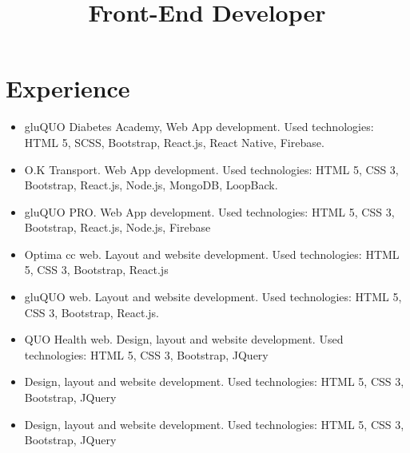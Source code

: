 \documentclass[11pt,a4paper]{moderncv}
\title{Front-End Developer}
\begin{document}
\maketitle
\section{Experience}
{\begin{itemize}
\item gluQUO Diabetes Academy, Web App development. Used technologies: HTML 5, SCSS, Bootstrap, React.js, React Native, Firebase.
\item O.K Transport. Web App development. Used technologies: HTML 5, CSS 3, Bootstrap, React.js, Node.js, MongoDB, LoopBack.
\item gluQUO PRO. Web App development. Used technologies: HTML 5, CSS 3, Bootstrap, React.js, Node.js, Firebase
\item Optima cc web. Layout and website development. Used technologies: HTML 5, CSS 3, Bootstrap, React.js
\item gluQUO web. Layout and website development. Used technologies: HTML 5, CSS 3, Bootstrap, React.js.
\item QUO Health web. Design, layout and website development. Used technologies: HTML 5, CSS 3, Bootstrap, JQuery
\end{itemize}
}
{
\begin{itemize}
\item Design, layout and website development. Used technologies: HTML 5, CSS 3, Bootstrap, JQuery
\end{itemize}
\begin{itemize}
\item Design, layout and website development. Used technologies: HTML 5, CSS 3, Bootstrap, JQuery
\end{itemize}
}
\end{document}
